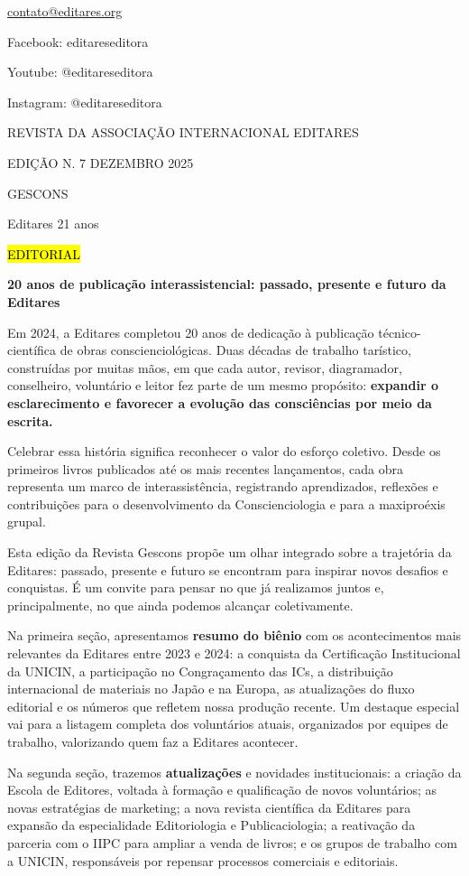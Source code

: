 \href{mailto:contato@editares.org}{\ul{contato@editares.org}}

Facebook: editareseditora

Youtube: @editareseditora

Instagram: @editareseditora

REVISTA DA ASSOCIAÇÃO INTERNACIONAL EDITARES

EDIÇÃO N. 7 \textbar{} DEZEMBRO \textbar{} 2025

GESCONS

Editares 21 anos

\hl{EDITORIAL}

\textbf{20 anos de publicação interassistencial: passado, presente e futuro da Editares}

Em 2024, a Editares completou 20 anos de dedicação à publicação técnico-científica de obras conscienciológicas. Duas décadas de trabalho tarístico, construídas por muitas mãos, em que cada autor, revisor, diagramador, conselheiro, voluntário e leitor fez parte de um mesmo propósito: \textbf{expandir o esclarecimento e favorecer a evolução das consciências por meio da escrita.}

Celebrar essa história significa reconhecer o valor do esforço coletivo. Desde os primeiros livros publicados até os mais recentes lançamentos, cada obra representa um marco de interassistência, registrando aprendizados, reflexões e contribuições para o desenvolvimento da Conscienciologia e para a maxiproéxis grupal.

Esta edição da Revista Gescons propõe um olhar integrado sobre a trajetória da Editares: passado, presente e futuro se encontram para inspirar novos desafios e conquistas. É um convite para pensar no que já realizamos juntos e, principalmente, no que ainda podemos alcançar coletivamente.

Na primeira seção, apresentamos \textbf{resumo do biênio} com os acontecimentos mais relevantes da Editares entre 2023 e 2024: a conquista da Certificação Institucional da UNICIN, a participação no Congraçamento das ICs, a distribuição internacional de materiais no Japão e na Europa, as atualizações do fluxo editorial e os números que refletem nossa produção recente. Um destaque especial vai para a listagem completa dos voluntários atuais, organizados por equipes de trabalho, valorizando quem faz a Editares acontecer.

Na segunda seção, trazemos \textbf{atualizações} e novidades institucionais: a criação da Escola de Editores, voltada à formação e qualificação de novos voluntários; as novas estratégias de marketing; a nova revista científica da Editares para expansão da especialidade Editoriologia e Publicaciologia; a reativação da parceria com o IIPC para ampliar a venda de livros; e os grupos de trabalho com a UNICIN, responsáveis por repensar processos comerciais e editoriais.

